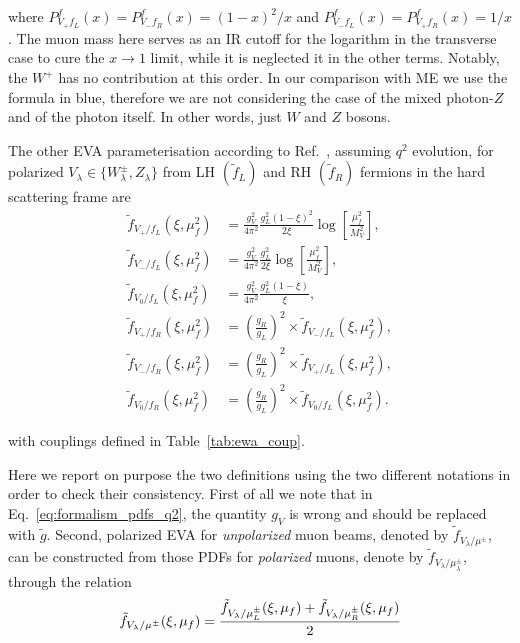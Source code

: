 \documentclass[a4paper,11pt]{article}
\begin{document}
where $P_{V_+ f_L}^f(x) = P_{V_- f_R}^f(x) = (1-x)^2 / x$ and $P_{V_- f_L}^f(x) = P_{V_+ f_R}^f(x) = 1 / x$.
The muon mass here serves as an IR cutoff for the logarithm in the transverse case to cure the $x\to 1$ limit, while it is neglected it in the other terms. Notably, the $W^+$ has no contribution at this order.
In our comparison with ME we use the formula in {\color{blue} blue}, therefore we are not considering the case of the mixed photon-$Z$ and of the photon itself.
In other words, just $W$ and $Z$ bosons.

The other EVA parameterisation  according to Ref.~\cite{Ruiz:2021tdt}, assuming $q^2$ evolution,
 for polarized $V_\lambda\in\{W_\lambda^\pm,Z_\lambda\}$ from LH $(\tilde{f}_L)$ and RH $(\tilde{f}_R)$ fermions in the hard scattering frame are 
\begin{subequations}
\label{eq:formalism_pdfs_q2}
\begin{align}
\tilde{f}_{V_+/f_L}(\xi,\mu_f^2) 	&= \frac{g_V^2}{4\pi^2} \frac{g_L^2(1-\xi)^2}{2\xi} \log \left[\frac{\mu_f^2}{M_V^2}\right], \\
\tilde{f}_{V_-/f_L}(\xi,\mu_f^2) 	&= \frac{g_V^2}{4\pi^2} \frac{g_L^2}{2\xi} \log \left[\frac{\mu_f^2}{M_V^2}\right], \\
\tilde{f}_{V_0 / f_L}(\xi,\mu_f^2) 	&= \frac{g_V^2}{4\pi^2} \frac{g_L^2(1-\xi)}{\xi},\\  
\tilde{f}_{V_+/f_R}(\xi,\mu_f^2) 	&= \left(\frac{g_R}{g_L}\right)^2 \times \tilde{f}_{V_-/f_L}(\xi,\mu_f^2), \\
\tilde{f}_{V_-/f_R}(\xi,\mu_f^2) 	&= \left(\frac{g_R}{g_L}\right)^2 \times \tilde{f}_{V_+/f_L}(\xi,\mu_f^2), \\
\tilde{f}_{V_0/f_R}(\xi,\mu_f^2) 	&= \left(\frac{g_R}{g_L}\right)^2 \times \tilde{f}_{V_0/f_L}(\xi,\mu_f^2). 
\end{align}
\end{subequations}

with couplings defined in Table~\ref{tab:ewa_coup}.

Here we report on purpose the two definitions using the two different notations in order to check their consistency.
First of all we note that in Eq.~\eqref{eq:formalism_pdfs_q2}, the quantity $g_V$ is wrong and should be replaced with $\tilde{g}$. Second,
polarized EVA for \textit{unpolarized} muon beams, denoted by $\tilde{f}_{V_\lambda/\mu^\pm}$, can be constructed from those PDFs for \textit{polarized} muons, denote by $\tilde{f}_{V_\lambda/\mu^\pm_\lambda}$, through the relation
\begin{equation}
 \tilde{f}_{V_\lambda/\mu^\pm}(\xi,\mu_f) =
 \cfrac{\tilde{f}_{V_\lambda/\mu^\pm_L}(\xi,\mu_f) + \tilde{f}_{V_\lambda/\mu^\pm_R}(\xi,\mu_f)}{2}
\label{eq:pdfDef_unpolarizedMuon}
\end{equation}
\end{document}

